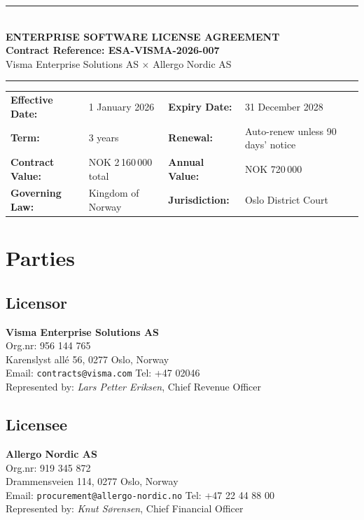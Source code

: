 \documentclass[a4paper,11pt]{article}
\begin{document}
\begin{center}
  {\color{brand}\rule{\textwidth}{2pt}}\\[12pt]
  {\color{brand}\huge\bfseries ENTERPRISE SOFTWARE LICENSE AGREEMENT}\\[8pt]
  {\large\bfseries Contract Reference: ESA-VISMA-2026-007}\\[6pt]
  {\large Visma Enterprise Solutions AS \quad $\times$ \quad Allergo Nordic AS}\\[12pt]
  {\color{brand}\rule{\textwidth}{2pt}}
\end{center}

\vspace{12pt}

\noindent
\begin{tabularx}{\textwidth}{lX lX}
  \textbf{Effective Date:} & 1 January 2026 &
  \textbf{Expiry Date:} & 31 December 2028 \\[4pt]
  \textbf{Term:} & 3 years &
  \textbf{Renewal:} & Auto-renew unless 90 days' notice \\[4pt]
  \textbf{Contract Value:} & NOK 2\,160\,000 total &
  \textbf{Annual Value:} & NOK 720\,000 \\[4pt]
  \textbf{Governing Law:} & Kingdom of Norway &
  \textbf{Jurisdiction:} & Oslo District Court \\
\end{tabularx}

\vspace{16pt}

\section{Parties}

\subsection{Licensor}
\textbf{Visma Enterprise Solutions AS}\\
Org.nr: 956 144 765\\
Karenslyst allé 56, 0277 Oslo, Norway\\
Email: \texttt{contracts@visma.com} \quad Tel: +47 02046\\
Represented by: \textit{Lars Petter Eriksen}, Chief Revenue Officer

\subsection{Licensee}
\textbf{Allergo Nordic AS}\\
Org.nr: 919 345 872\\
Drammensveien 114, 0277 Oslo, Norway\\
Email: \texttt{procurement@allergo-nordic.no} \quad Tel: +47 22 44 88 00\\
Represented by: \textit{Knut Sørensen}, Chief Financial Officer
\end{document}
